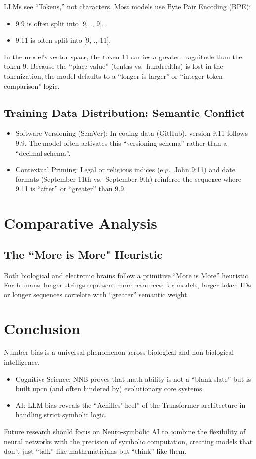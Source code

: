 LLMs see “Tokens,” not characters. Most models use Byte Pair Encoding (BPE):
\begin{itemize}
    \item 9.9 is often split into [9, ., 9].
    \item 9.11 is often split into [9, ., 11].
\end{itemize}
In the model’s vector space, the token 11 carries a greater magnitude than the token 9. Because the “place value” (tenths vs. hundredths) is lost in the tokenization, the model defaults to a “longer-is-larger” or “integer-token-comparison” logic\cite{jnc2025}.

\subsection{Training Data Distribution: Semantic Conflict}

\begin{itemize}
    \item Software Versioning (SemVer): In coding data (GitHub), version 9.11 follows 9.9. The model often activates this “versioning schema” rather than a “decimal schema”\cite{wallace2019}.
    \item Contextual Priming: Legal or religious indices (e.g., John 9:11) and date formats (September 11th vs. September 9th) reinforce the sequence where 9.11 is “after” or “greater” than 9.9\cite{pathak2025}.
\end{itemize}

\section{Comparative Analysis}

\subsection{The ``More is More" Heuristic}

Both biological and electronic brains follow a primitive “More is More” heuristic. For humans, longer strings represent more resources; for models, larger token IDs or longer sequences correlate with “greater” semantic weight.

\section{Conclusion}

Number bias is a universal phenomenon across biological and non-biological intelligence.
\begin{itemize}
    \item Cognitive Science: NNB proves that math ability is not a “blank slate” but is built upon (and often hindered by) evolutionary core systems.
    \item AI: LLM bias reveals the “Achilles’ heel” of the Transformer architecture in handling strict symbolic logic.
\end{itemize}
Future research should focus on Neuro-symbolic AI to combine the flexibility of neural networks with the precision of symbolic computation, creating models that don’t just “talk” like mathematicians but “think” like them.

\newpage
\begingroup
    \printbibliography[title={References}]
\endgroup